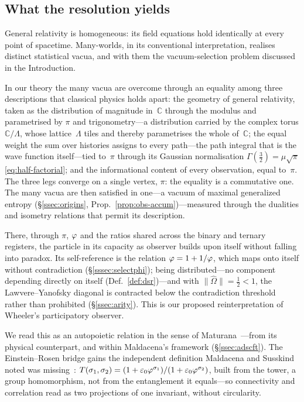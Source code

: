 \subsection{What the resolution yields}\label{ssec:disc-yields}

General relativity is homogeneous: its field equations hold identically
at every point of spacetime. Many-worlds, in its conventional
interpretation, realises distinct statistical vacua, and with them the
vacuum-selection problem discussed in the Introduction.

In our theory the many vacua are overcome through an equality among three
descriptions that classical physics holds apart: the geometry of general
relativity, taken as the distribution of magnitude in~$\mathbb{C}$ through the
modulus and parametrised by $\pi$ and trigonometry---a distribution
carried by the complex torus $\mathbb{C}/\Lambda$, whose lattice~$\Lambda$ tiles
and thereby parametrises the whole of~$\mathbb{C}$; the equal weight the sum over
histories assigns to every path---the path integral that is the wave
function itself---tied to~$\pi$ through its Gaussian normalisation
$\Gamma(\tfrac32)=\mu\sqrt{\pi}$ \eqref{eq:half-factorial}; and the
informational content of every observation, equal to~$\pi$. The three
legs converge on a single vertex, $\pi$: the equality is a commutative
one. The many vacua are then satisfied in one---a vacuum of maximal
generalized entropy (\S\ref{ssec:origins}, Prop.~\ref{prop:obs-accum})---measured through the dualities and
isometry relations that permit its description.

There, through $\pi$, $\varphi$ and the ratios shared across the binary
and ternary registers, the particle in its capacity as observer builds
upon itself without falling into paradox. Its self-reference is the
relation $\varphi=1+1/\varphi$, which maps onto itself without
contradiction (\S\ref{sssec:selectphi}); being distributed---no component
depending directly on itself (Def.~\ref{def:dsr})---and with
$\|\hat\Omega\|=\tfrac12<1$, the Lawvere--Yanofsky diagonal is contracted
below the contradiction threshold rather than prohibited
(\S\ref{ssec:arity}). This is our proposed reinterpretation of Wheeler's
participatory observer.

We read this as an autopoietic relation in the
sense of Maturana~\cite{maturana1980}---from its physical counterpart, and
within Maldacena's framework (\S\ref{ssec:adscft}). The
Einstein--Rosen bridge gains the independent definition Maldacena and
Susskind noted was missing~\cite{MaldacenaSusskind13}:
$T(\sigma_1,\sigma_2)=(1+\varepsilon_0\varphi^{\sigma_1})/
(1+\varepsilon_0\varphi^{\sigma_2})$, built from the tower, a group
homomorphism, not from the entanglement it equals---so connectivity and
correlation read as two projections of one invariant, without
circularity.

